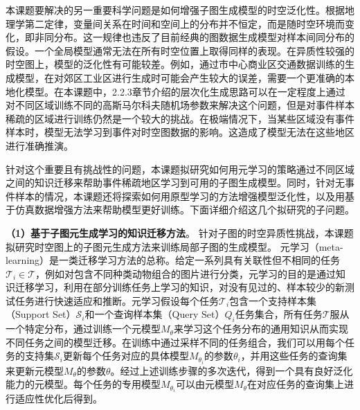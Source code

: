 \documentclass[12pt,UTF8,AutoFakeBold=2,a4paper]{ctexart} %
\begin{document}
本课题要解决的另一重要科学问题是如何增强子图生成模型的时空泛化性。根据地理学第二定律，变量间关系在时间和空间上的分布并不恒定，而是随时空环境而变化，即非同分布。这一规律也违反了目前经典的图数据生成模型对样本间同分布的假设。一个全局模型通常无法在所有时空位置上取得同样的表现。在异质性较强的时空图上，模型的泛化性有可能较差。例如，通过市中心商业区交通数据训练的生成模型，在对郊区工业区进行生成时可能会产生较大的误差，需要一个更准确的本地化模型。在本课题中，2.2.3章节介绍的层次化生成思路可以在一定程度上通过对不同区域训练不同的高斯马尔科夫随机场参数来解决这个问题，但是对事件样本稀疏的区域进行训练仍然是一个较大的挑战。在极端情况下，当某些区域没有事件样本时，模型无法学习到事件对时空图数据的影响。这造成了模型无法在这些地区进行准确推演。

针对这个重要且有挑战性的问题，本课题拟研究如何用元学习的策略通过不同区域之间的知识迁移来帮助事件稀疏地区学习到可用的子图生成模型。同时，针对无事件样本的情况，本课题还将探索如何用原型学习的方法增强模型泛化性，以及用基于仿真数据增强方法来帮助模型更好训练。下面详细介绍这几个拟研究的子问题。

\textbf{（1）基于子图元生成学习的知识迁移方法}。
%
针对子图的时空异质性挑战，本课题拟研究时空图上的子图元生成方法来训练局部子图的生成模型。%
%
元学习（meta-learning）是一类迁移学习方法的总称。给定一系列具有关联性但不相同的任务$\mathcal{T}_i\in \mathcal{T}$，例如对包含不同种类动物组合的图片进行分类，元学习的目的是通过知识迁移学习，利用在部分训练任务上学习的知识，对没有见过的、样本较少的新测试任务进行快速适应和推断。元学习假设每个任务$\mathcal{T}_i$包含一个支持样本集（Support Set）$\mathcal{S}_i$和一个查询样本集（Query Set）${Q_i}$任务集合，所有任务$\mathcal{T}$服从一个特定分布，通过训练一个元模型$M_\theta$来学习这个任务分布的通用知识从而实现不同任务之间的模型迁移。在训练中通过采样不同的任务组合，我们可以用每个任务的支持集$\mathcal{S}_i$更新每个任务对应的具体模型$M_{\theta_i}$的参数$\theta_i$，并用这些任务的查询集来更新元模型$M_{\theta}$的参数$\theta$。经过上述训练步骤的多次迭代，得到一个具有良好泛化能力的元模型。每个任务的专用模型$M_{\theta_i}$可以由元模型$M_\theta$在对应任务的查询集上进行适应性优化后得到。
\end{document}
